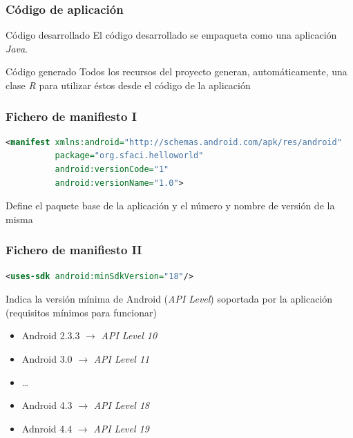 \documentclass[xcolor={dvipsnames}]{beamer}
\begin{document}
\begin{frame}\frametitle{Código de aplicación}
    \begin{block}{Código desarrollado}
    El código desarrollado se empaqueta como una aplicación \emph{Java}.
    \end{block}
    \begin{block}{Código generado}
    Todos los recursos del proyecto generan, automáticamente, una clase \emph{\textcolor{resalta}{R}} para utilizar éstos desde el código de la aplicación
    \end{block}
\end{frame}

\begin{frame}[fragile]\frametitle{Fichero de manifiesto I}
    \begin{block}{}
    \begin{lstlisting}[language=XML]
<manifest xmlns:android="http://schemas.android.com/apk/res/android"
          package="org.sfaci.helloworld"
          android:versionCode="1"
          android:versionName="1.0">
    \end{lstlisting}
    \end{block}
    \begin{block}{}
    Define el paquete base de la aplicación y el número y nombre de versión de la misma
    \end{block}
\end{frame}

\begin{frame}[fragile]\frametitle{Fichero de manifiesto II}
    \begin{block}{}
    \begin{lstlisting}[language=XML]
<uses-sdk android:minSdkVersion="18"/>
    \end{lstlisting}
    \end{block}
    \begin{block}{}
    Indica la versión mínima de Android (\emph{API Level}) soportada por la aplicación (requisitos mínimos para funcionar)
    \begin{itemize}
        \item Android 2.3.3 $\rightarrow$ \emph{API Level 10}
        \item Android 3.0 $\rightarrow$ \emph{API Level 11}
        \item \ldots
        \item Android 4.3 $\rightarrow$ \emph{API Level 18}
        \item Adnroid 4.4 $\rightarrow$ \emph{API Level 19}
    \end{itemize}
    \end{block}
\end{frame}
\end{document}
